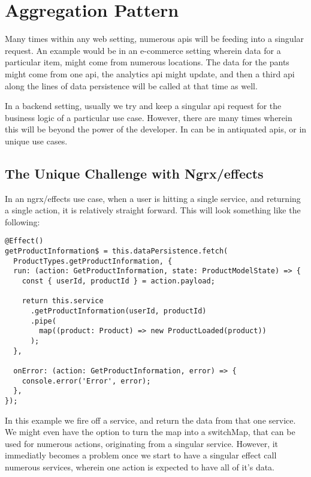 \maketitle{}
\section{ Aggregation Pattern }

Many times within any web setting, numerous apis will be feeding into a singular
request. An example would be in an e-commerce setting wherein data for a
particular item, might come from numerous locations. The data for the pants
might come from one api, the analytics api might update, and then a third api
along the lines of data persistence will be called at that time as well.

In a backend setting, usually we try and keep a singular api request for the
business logic of a particular use case. However, there are many times wherein
this will be beyond the power of the developer. In can be in antiquated apis,
or in unique use cases.

\subsection{ The Unique Challenge with Ngrx/effects}
In an ngrx/effects use case, when a user is hitting a single service, and
returning a single action, it is relatively straight forward. This will look
something like the following:
\begin{lstlisting}
@Effect()
getProductInformation$ = this.dataPersistence.fetch(
  ProductTypes.getProductInformation, {
  run: (action: GetProductInformation, state: ProductModelState) => {
    const { userId, productId } = action.payload;

    return this.service
      .getProductInformation(userId, productId)
      .pipe(
        map((product: Product) => new ProductLoaded(product))
      );
  },

  onError: (action: GetProductInformation, error) => {
    console.error('Error', error);
  },
});
\end{lstlisting}

In this example we fire off a service, and return the data from that one
service. We might even have the option to turn the map into a switchMap, that
can be used for numerous actions, originating from a singular service. However,
it immediatly becomes a problem once we start to have a singular effect call
numerous services, wherein one action is expected to have all of it's data. 
